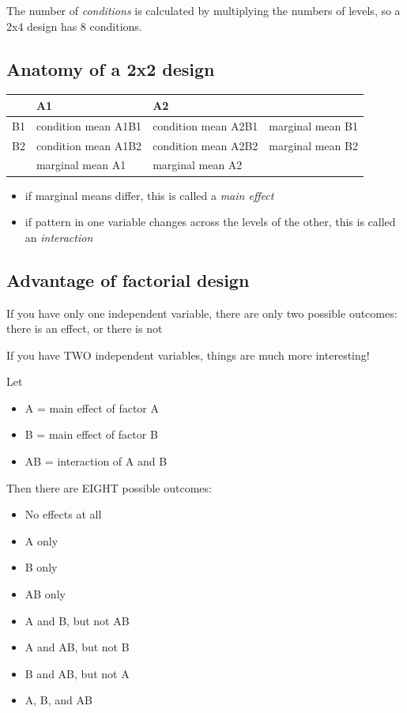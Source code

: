 \documentclass[article,10pt]{article}
\begin{document}
The number of \emph{conditions} is calculated by multiplying the numbers of levels, so a 2x4 design has 8 conditions.

\subsection*{Anatomy of a 2x2 design}
\label{sec-3-1}

\begin{center}
\begin{tabular}{llll}
 & A1 & A2 & \\
\hline
B1 & condition mean A1B1 & condition mean A2B1 & marginal mean B1\\
B2 & condition mean A1B2 & condition mean A2B2 & marginal mean B2\\
\hline
 & marginal mean A1 & marginal mean A2 & \\
\end{tabular}
\end{center}

\begin{itemize}
\item if marginal means differ, this is called a \emph{main effect}
\item if pattern in one variable changes across the levels of the other, this is called an \emph{interaction}
\end{itemize}

\subsection*{Advantage of factorial design}
\label{sec-3-2}

If you have only one independent variable, there are only two possible outcomes: there is an effect, or there is not

If you have TWO independent variables, things are much more interesting!

Let 
\begin{itemize}
\item A = main effect of factor A
\item B = main effect of factor B
\item AB = interaction of A and B
\end{itemize}

Then there are EIGHT possible outcomes:
\begin{itemize}
\item No effects at all
\item A only
\item B only
\item AB only
\item A and B, but not AB
\item A and AB, but not B
\item B and AB, but not A
\item A, B, and AB
\end{itemize}
\end{document}
